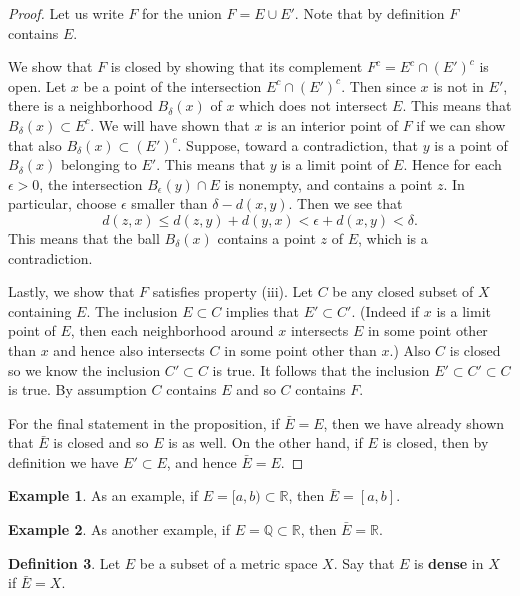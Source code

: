 \documentclass[12pt]{article}
\theoremstyle{definition}
\newtheorem{definition}{Definition}
\newtheorem{example}[definition]{Example}
\theoremstyle{theorem}
\begin{document}
\begin{proof}
Let us write $F$ for the union $F = E \cup E'$. Note that by definition $F$ contains $E$. 

We show that $F$ is closed by showing that its complement $F^c = E^c \cap (E')^c$ is open. Let $x$ be a point of the intersection $E^c \cap (E')^c$. Then since $x$ is not in $E'$, there is a neighborhood $B_\delta(x)$ of $x$ which does not intersect $E$. This means that $B_\delta(x) \subset E^c$. We will have shown that $x$ is an interior point of $F$ if we can show that also $B_\delta(x) \subset (E')^c$. Suppose, toward a contradiction, that $y$ is a point of $B_\delta(x)$ belonging to $E'$. This means that $y$ is a limit point of $E$. Hence for each $\epsilon > 0$, the intersection $B_\epsilon(y) \cap E$ is nonempty, and contains a point $z$. In particular, choose $\epsilon$ smaller than $\delta - d(x,y)$. Then we see that 
\[
d(z,x) \leqslant d(z,y) + d(y,x) < \epsilon + d(x,y) < \delta.
\]
This means that the ball $B_\delta(x)$ contains a point $z$ of $E$, which is a contradiction. 

Lastly, we show that $F$ satisfies property (iii). Let $C$ be any closed subset of $X$ containing $E$. The inclusion $E \subset C$ implies that $E' \subset C'$. (Indeed if $x$ is a limit point of $E$, then each neighborhood around $x$ intersects $E$ in some point other than $x$ and hence also intersects $C$ in some point other than $x$.) Also $C$ is closed so we know the inclusion $C' \subset C$ is true. It follows that the inclusion $E' \subset C' \subset C$ is true. By assumption $C$ contains $E$ and so $C$ contains $F$. 

For the final statement in the proposition, if $\bar{E} = E$, then we have already shown that $\bar{E}$ is closed and so $E$ is as well. On the other hand, if $E$ is closed, then by definition we have $E' \subset E$, and hence $\bar{E} = E$.  
\end{proof}

\begin{example}
As an example, if $E = [a,b) \subset \mathbb{R}$, then $\bar{E} = [a,b]$. 
\end{example}

\begin{example}
As another example, if $E = \mathbb{Q} \subset \mathbb{R}$, then $\bar{E} = \mathbb{R}$. 
\end{example}

\begin{definition}
Let $E$ be a subset of a metric space $X$. Say that $E$ is \textbf{dense} in $X$ if $\bar{E} = X$. 
\end{definition}
\end{document}
